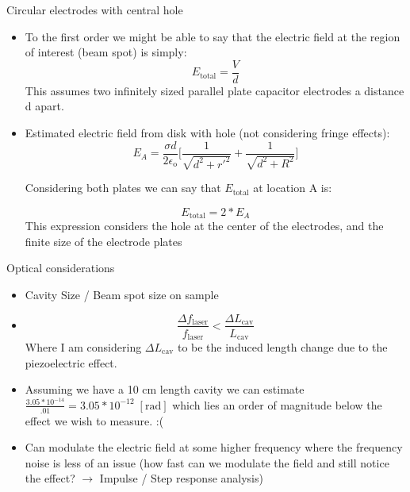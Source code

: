 \documentclass{beamer}
\begin{document}
\begin{frame}
\end{frame}

\begin{frame}{Circular electrodes with central hole}
\begin{itemize}
\item To the first order we might be able to say that the electric field at the region of interest (beam spot) is simply: 
$$
E_{\mathrm{total}} = \frac{V}{d}
$$
This assumes two infinitely sized parallel plate capacitor electrodes a distance d apart.
\item Estimated electric field from disk with hole (not considering fringe effects): 
$$
E_{A} = \frac{\sigma d}{2 \epsilon_\mathrm{o}}\bigg[ \frac{1}{\sqrt{d^{2} + r'^{2}}} + \frac{1}{\sqrt{d^2 + R^2}}\bigg]
$$

Considering both plates we can say that $E_{\mathrm{total}}$ at location A is: 

$$
E_{\mathrm{total}} = 2*E_{A}
$$
This expression considers the hole at the center of the electrodes, and the finite size of the electrode plates
\end{itemize}

\end{frame}
\begin{frame}{Optical considerations}
\begin{itemize}
\item Cavity Size / Beam spot size on sample
\item 
$$\frac{\Delta f_{\mathrm{laser}}}{f_{\mathrm{laser}}}< \frac{\Delta L_{\mathrm{cav}}}{L_{\mathrm{cav}}}$$
Where I am considering $\Delta L_{\mathrm{cav}}$ to be the induced length change due to the piezoelectric effect.
\item Assuming we have a 10 cm length cavity we can estimate $\frac{3.05*10^{-14}}{.01} = 3.05*10^{-12}\; [\mathrm{rad}]$ which lies an order of magnitude below the effect we wish to measure. :(
\item Can modulate the electric field at some higher frequency where the frequency noise is less of an issue (how fast can we modulate the field and still notice the effect? $\rightarrow$ Impulse / Step response analysis)
\end{itemize}

\end{frame}
\end{document}
